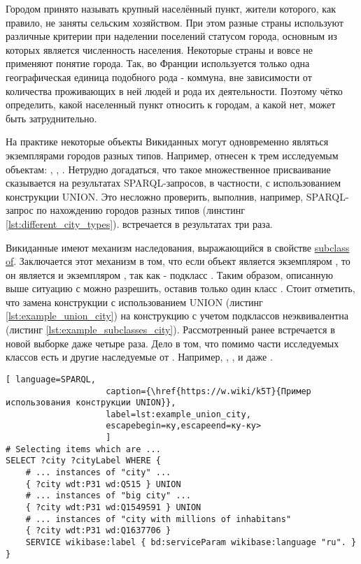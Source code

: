 Городом принято называть крупный населённый пункт, жители которого, как правило, не заняты сельским хозяйством. При этом разные страны используют различные критерии при наделении поселений статусом города, основным из которых является численность населения. Некоторые страны и вовсе не применяют понятие города. Так, во Франции используется только одна географическая единица подобного рода - коммуна, вне зависимости от количества проживающих в ней людей и рода их деятельности. Поэтому чётко определить, какой населенный пункт относить к городам, а какой нет, может быть затруднительно.

На практике некоторые объекты Викиданных могут одновременно являться экземплярами городов разных типов. Например,  отнесен к трем исследуемым объектам: , , . Нетрудно догадаться, что такое множественное присваивание сказывается на результатах SPARQL-запросов, в частности, с использованием конструкции UNION. Это несложно проверить, выполнив, например, SPARQL-запрос по нахождению городов разных типов (линстинг \ref{lst:different_city_types}).  встречается в результатах три раза. 

Викиданные имеют механизм наследования, выражающийся в свойстве \href{https://www.wikidata.org/wiki/Property:P279}{subclass of}. Заключается этот механизм в том, что если объект является экземпляром , то он является и экземпляром  , так как  - подкласс  . Таким образом, описанную выше ситуацию с  можно разрешить, оставив только один класс . Стоит отметить, что замена конструкции с использованием UNION (листинг \ref{lst:example_union_city}) на конструкцию с учетом подклассов неэквивалентна (листинг \ref{lst:example_subclasses_city}). Рассмотренный ранее  встречается в новой выборке даже четыре раза. Дело в том, что помимо части исследуемых классов есть и другие наследуемые от . Например, , ,  и даже .

\begin{lstlisting}[ language=SPARQL, 
                    caption={\href{https://w.wiki/k5T}{Пример использования конструкции UNION}},
                    label=lst:example_union_city, 
                    escapebegin=ку,escapeend=ку-ку>
                    ]
# Selecting items which are ...
SELECT ?city ?cityLabel WHERE {
	# ... instances of "city" ...                  
	{ ?city wdt:P31 wd:Q515 } UNION    
	# ... instances of "big city" ...                               
	{ ?city wdt:P31 wd:Q1549591 } UNION     
	# ... instances of "city with millions of inhabitans"                          
	{ ?city wdt:P31 wd:Q1637706 }                                     
	SERVICE wikibase:label { bd:serviceParam wikibase:language "ru". }
}
\end{lstlisting}


